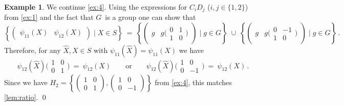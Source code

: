 \documentclass{lmcs}
\theoremstyle{definition}
\newtheorem{example}[thm]{Example}
\begin{document}
\begin{example} \label{ex:5}
We continue \cref{ex:4}.
Using the expressions for $C_i D_j$ ($i,j \in \{1,2\}$) from \cref{ex:1} and the fact that $G$~is a group one can show that
\[
\left\{\begin{pmatrix}\psi_{1 1}(X) & \psi_{1 2}(X) \end{pmatrix} \mid X \in S\right\}
\ = \
\left\{\begin{pmatrix} g & g \big(\begin{smallmatrix}0&1\\1&0\end{smallmatrix}\big) \end{pmatrix} \mid g \in G\right\} \; \cup \;
\left\{\begin{pmatrix} g & g \big(\begin{smallmatrix}0&-1\\1&0\end{smallmatrix}\big) \end{pmatrix} \mid g \in G\right\}\,.
\]
Therefore, for any $\widehat{X}, X \in S$ with $\psi_{1 1}(\widehat{X}) = \psi_{1 1}(X)$ we have
\[
 \psi_{1 2}(\widehat{X}) \big(\begin{smallmatrix}1&0\\0&1\end{smallmatrix}\big) \ = \ \psi_{1 2}(X) \qquad \text{or} \qquad
 \psi_{1 2}(\widehat{X}) \big(\begin{smallmatrix}1&0\\0&-1\end{smallmatrix}\big) \ = \ \psi_{1 2}(X)\,.
\]
Since we have $H_2 = \left\{\left(\begin{smallmatrix}1&0\\0&1\end{smallmatrix}\right), \left(\begin{smallmatrix}1&0\\0&-1\end{smallmatrix}\right)\right\}$
from \cref{ex:4}, this matches \cref{lem:ratio}.
\qed
\end{example}
\end{document}
